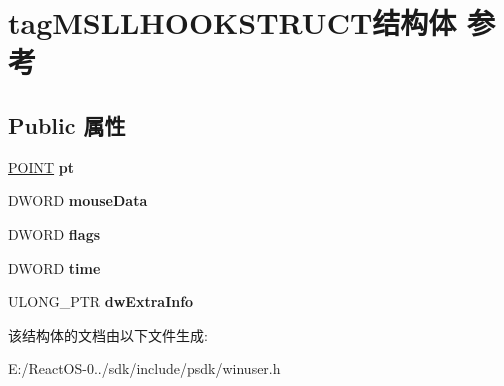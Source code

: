 \hypertarget{structtag_m_s_l_l_h_o_o_k_s_t_r_u_c_t}{}\section{tag\+M\+S\+L\+L\+H\+O\+O\+K\+S\+T\+R\+U\+C\+T结构体 参考}
\label{structtag_m_s_l_l_h_o_o_k_s_t_r_u_c_t}
\subsection*{Public 属性}
\begin{DoxyCompactItemize}
\item 
\mbox{\label{structtag_m_s_l_l_h_o_o_k_s_t_r_u_c_t_a3f4d30db3f52935c4fa7c0e1e037c964}} 
\hyperlink{structtag_p_o_i_n_t}{P\+O\+I\+NT} {\bfseries pt}
\item 
\mbox{\label{structtag_m_s_l_l_h_o_o_k_s_t_r_u_c_t_a1ded85ccea77725ac008e5a087ee102f}} 
D\+W\+O\+RD {\bfseries mouse\+Data}
\item 
\mbox{\label{structtag_m_s_l_l_h_o_o_k_s_t_r_u_c_t_a22d641caacd0d272d37fb04c9e5c539c}} 
D\+W\+O\+RD {\bfseries flags}
\item 
\mbox{\label{structtag_m_s_l_l_h_o_o_k_s_t_r_u_c_t_a66bbdd2c059bfb9bbd544575ab2b3376}} 
D\+W\+O\+RD {\bfseries time}
\item 
\mbox{\label{structtag_m_s_l_l_h_o_o_k_s_t_r_u_c_t_ae69036cc677d5547b9fcc61363d9d690}} 
U\+L\+O\+N\+G\+\_\+\+P\+TR {\bfseries dw\+Extra\+Info}
\end{DoxyCompactItemize}


该结构体的文档由以下文件生成\+:\begin{DoxyCompactItemize}
\item 
E\+:/\+React\+O\+S-\/0../sdk/include/psdk/winuser.\+h\end{DoxyCompactItemize}
